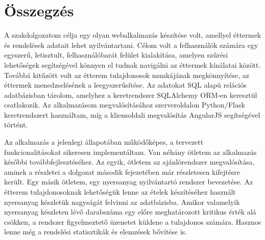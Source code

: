 \chapter{Összegzés}

A szakdolgozatom célja egy olyan webalkalmazás készítése volt, amellyel éttermek és rendelések adatait lehet nyilvántartani. Célom volt a felhasználók számára egy egyszerű, letisztult, felhasználóbarát felület kialakítása, amelyen szűrési lehetőségek segítségével könnyen el tudnak navigálni az éttermek kínálatai között. Továbbá kitűzött volt az étterem tulajdonosok munkájának megkönnyítése, az éttermek menedzselésének a leegyszerűsítése. Az adatokat SQL alapú relációs adatbázisban tárolom, amelyhez a keretrendszer SQLAlchemy ORM-en keresztül csatlakozik. Az alkalmazásom megvalósításához szerveroldalon Python/Flask keretrendszert használtam, míg a kliensoldali megvalósítás AngularJS segítségével történt.

Az alkalmazás a jelenlegi állapotában működőképes, a tervezett funkcionalitásokat sikeresen implementáltam. Van néhány ötletem az alkalmazás későbbi továbbfejlesztéséhez. Az egyik, ötletem az ajánlórendszer megvalósítása, aminek a részletei a dolgozat második fejezetében már részletesen kifejtésre került. Egy másik ötletem, egy nyersanyag nyilvántartó rendszer bevezetése. Az étterem tulajdonosoknak lehetőségük lenne az ételek készítéséhez használt nyersanyag készletük nagyságát felvinni az adatbázisba. Amikor valamelyik nyersanyag készleten lévő darabszáma egy előre meghatározott kritikus érték alá csökken, a rendszer figyelmeztető üzenetet küldene a tulajdonos számára. Hasznos lenne még a rendelési statisztikák és elemzések bővítése is.
